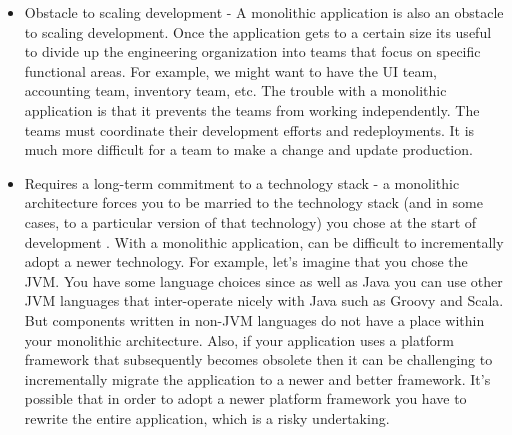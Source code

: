 \begin{itemize}
    \item Obstacle to scaling development - A monolithic application is also an obstacle to scaling development. Once the application gets to a certain size its useful to divide up the engineering organization into teams that focus on specific functional areas. For example, we might want to have the UI team, accounting team, inventory team, etc. The trouble with a monolithic application is that it prevents the teams from working independently. The teams must coordinate their development efforts and redeployments. It is much more difficult for a team to make a change and update production.

    \item Requires a long-term commitment to a technology stack - a monolithic architecture forces you to be married to the technology stack (and in some cases, to a particular version of that technology) you chose at the start of development . With a monolithic application, can be difficult to incrementally adopt a newer technology. For example, let's imagine that you chose the JVM. You have some language choices since as well as Java you can use other JVM languages that inter-operate nicely with Java such as Groovy and Scala. But components written in non-JVM languages do not have a place within your monolithic architecture. Also, if your application uses a platform framework that subsequently becomes obsolete then it can be challenging to incrementally migrate the application to a newer and better framework. It's possible that in order to adopt a newer platform framework you have to rewrite the entire application, which is a risky undertaking.
\end{itemize}

